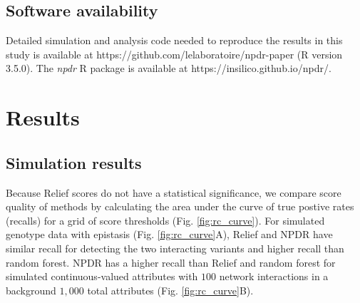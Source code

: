 \documentclass{bioinfo}
\begin{document}
\subsection{Software availability}
Detailed simulation and analysis code needed to reproduce the results in this study is available at {{https://github.com/lelaboratoire/npdr-paper}} (R version 3.5.0).
The \emph{npdr} R package is available at {{https://insilico.github.io/npdr/}}.


\section{Results}
\subsection{Simulation results} 


Because Relief scores do not have a statistical significance, we compare score quality of methods by calculating the area under the curve of true postive rates (recalls) for a grid of score thresholds (Fig. \ref{fig:rc_curve}). For simulated genotype data with epistasis (Fig. \ref{fig:rc_curve}A), Relief and NPDR have similar recall for detecting the two interacting variants and higher recall than random forest. NPDR has a higher recall than Relief and random forest for simulated continuous-valued attributes with $100$ network interactions in a background $1,000$ total attributes (Fig. \ref{fig:rc_curve}B). 
\end{document}
